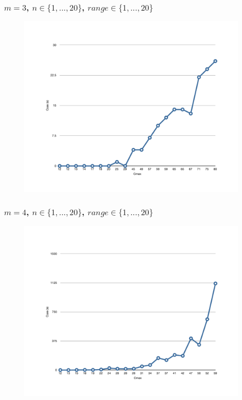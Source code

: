 \documentclass[wide,a4paper,titlepage,12pt] {article}
\begin{document}
    \subsubsection{$m=3$, $n \in \{1,...,20\}$, $range \in \{1,...,20\}$}
     \begin{figure}[htbp]
      \begin{center}
       \includegraphics[width=\textwidth]{Fig3.pdf}
        \caption{}
	\label{fig3}
      \end{center}
    \end{figure} \newpage
    \subsubsection{$m=4$, $n \in \{1,...,20\}$, $range \in \{1,...,20\}$}
     \begin{figure}[htbp]
      \begin{center}
       \includegraphics[width=\textwidth]{Fig4.pdf}
        \caption{}
	\label{fig4}
      \end{center}
    \end{figure} \newpage
\end{document}
